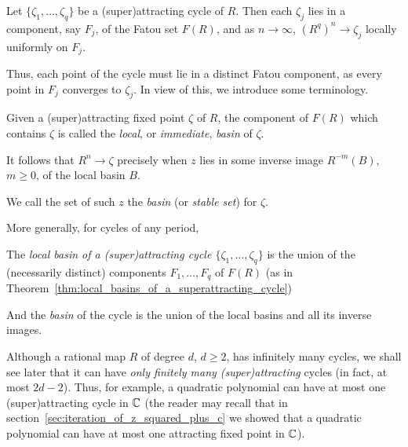 \begin{theorem}
    \label{thm:local_basins_of_a_superattracting_cycle}
    Let $\{\zeta_1, \dots, \zeta_q\}$ be a (super)attracting cycle of $R$. Then
    each $\zeta_j$ lies in a component, say $F_j$, of the Fatou set $F(R)$, and as
    $n \to \infty$, $(R^q)^n \to \zeta_j$ locally uniformly on $F_j$.
\end{theorem}

Thus, each point of the cycle must lie in a distinct Fatou component, as every
point in $F_j$ converges to $\zeta_j$. In view of this, we introduce some
terminology.

\begin{definition}
    Given a (super)attracting fixed point $\zeta$ of $R$, the component of
    $F(R)$ which contains $\zeta$ is called the \emph{local}, or
    \emph{immediate}, \emph{basin} of $\zeta$.
\end{definition}

It follows that $R^n \to \zeta$ precisely when $z$ lies in some inverse image
$R^{-m}(B)$, $m \geq 0$, of the local basin $B$.

\begin{definition}
    We call the set of such $z$ the \emph{basin} (or \emph{stable set}) for
    $\zeta$. 
\end{definition}

More generally, for cycles of any period,

\begin{definition}
    The \emph{local basin of a (super)attracting cycle $\{\zeta_1, \dots,
    \zeta_q\}$} is the union of the (necessarily distinct) components $F_1,
    \dots, F_q$ of $F(R)$ (as in
    Theorem~\ref{thm:local_basins_of_a_superattracting_cycle})
\end{definition}

\begin{definition}
    And the \emph{basin} of the cycle is the union of the local basins and all
    its inverse images.
\end{definition}

Although a rational map $R$ of degree $d$, $d \geq 2$, has infinitely many
cycles, we shall see later that it can have \emph{only finitely many
(super)attracting} cycles (in fact, at most $2d - 2$). Thus, for example, a
quadratic polynomial can have at most one (super)attracting cycle in $\mathbb{C}$ (the
reader may recall that in section~\ref{sec:iteration_of_z_squared_plus_c} we
showed that a quadratic polynomial can have at most one attracting fixed point
in $\mathbb{C}$).

